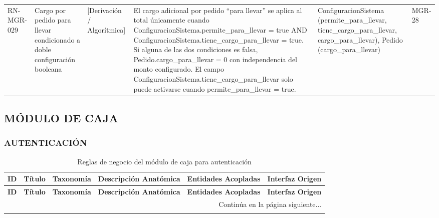 \begin{landscape}
\begin{longtable}[c]{l p{2.1cm} p{2.1cm} p{8cm} p{4cm} p{3cm}}
\addlinespace
RN-MGR-029 & Cargo por pedido para llevar condicionado a doble configuración booleana & [Derivación / Algorítmica] & El cargo adicional por pedido ``para llevar'' se aplica al total únicamente cuando ConfiguracionSistema.permite\_para\_llevar = true AND ConfiguracionSistema.tiene\_cargo\_para\_llevar = true. Si alguna de las dos condiciones es falsa, Pedido.cargo\_para\_llevar = 0 con independencia del monto configurado. El campo ConfiguracionSistema.tiene\_cargo\_para\_llevar solo puede activarse cuando permite\_para\_llevar = true. & ConfiguracionSistema (permite\_para\_llevar, tiene\_cargo\_para\_llevar, cargo\_para\_llevar), Pedido (cargo\_para\_llevar) & MGR-28 \\
\end{longtable}
\endgroup

\subsection{MÓDULO DE CAJA}
\subsubsection{AUTENTICACIÓN}
\begingroup
\setlength{\LTleft}{\fill}
\setlength{\LTright}{\fill}

\begin{longtable}[c]{l p{2.1cm} p{2.1cm} p{8cm} p{4cm} p{3cm}}
\caption{Reglas de negocio del módulo de caja para autenticación} \label{tab:reglas-negocio-caja-autenticacion}\\
\toprule
\textbf{ID} & \textbf{Título} & \textbf{Taxonomía} & \textbf{Descripción Anatómica} & \textbf{Entidades Acopladas} & \textbf{Interfaz Origen} \\
\midrule
\endfirsthead

\toprule
\textbf{ID} & \textbf{Título} & \textbf{Taxonomía} & \textbf{Descripción Anatómica} & \textbf{Entidades Acopladas} & \textbf{Interfaz Origen} \\
\midrule
\endhead

\midrule
\multicolumn{6}{r}{\small Continúa en la página siguiente...} \\
\endfoot
\bottomrule
\endlastfoot


\end{longtable}
\end{landscape}
